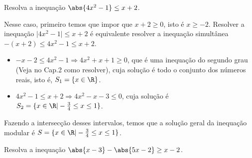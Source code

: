 \begin{example}
  Resolva a inequação \(\abs{4x^2-1} \leq x+2\).

  \solution
  Nesse caso, primeiro temos que impor que $x+2 \geq 0$, isto é $x \geq -2$.
  Resolver a inequação $\vert 4x^2-1 \vert \leq x+2$ é equivalente resolver a
  inequação simultânea $-(x+2) \leq 4x^2-1 \leq x+2$.
  \begin{itemize}
      \item[1.] $-x-2 \leq 4x^2-1 \Rightarrow 4x^2+x+1 \geq 0$, que é uma
        inequação do segundo grau (Veja no Cap.2 como resolver), cuja solução
        é todo o conjunto dos números reais, isto é, $S_1= \{ x \in
        \R \}$.

      \item[2.] $4x^2-1 \leq x+2 \Rightarrow 4x^2-x-3 \leq 0$, cuja
        solução é $S_2= \{ x \in \R| -\frac{3}{4} \leq x \leq 1 \}$.
  \end{itemize}
  Fazendo a intersecção desses intervalos, temos que a solução geral da
  inequação modular é $S=\{ x \in \R | -\frac{3}{4} \leq x \leq 1
  \}$.
\end{example}

\begin{example}
  Resolva a inequação \(\abs{x-3} - \abs{5x-2} \geq x-2\).

  \solution
\end{example}

